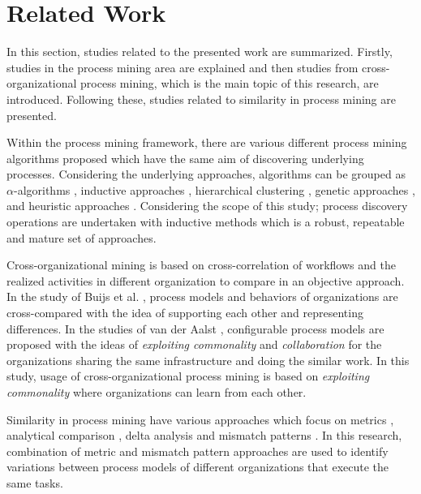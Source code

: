 \section{Related Work}
\label{sec:relatedwork}

In this section, studies related to the presented work are summarized. Firstly, studies in the process mining area are explained and then studies from cross-organizational process mining, which is the main topic of this research, are introduced. Following these, studies related to similarity in process mining are presented.

Within the process mining framework, there are various different process mining algorithms proposed which have the same aim of discovering underlying processes. Considering the underlying approaches, algorithms can be grouped as $\alpha$-algorithms \cite{van2004workflow,de2004process}, inductive approaches \cite{herbst1998integrating,herbst2000dealing}, hierarchical clustering \cite{greco2005mining}, genetic approaches \cite{van2005genetic,esgin2010hybrid}, and heuristic approaches \cite{esgin2009hybrid}. Considering the scope of this study; process discovery operations are undertaken with inductive methods which is a robust, repeatable and mature set of approaches.

Cross-organizational mining is based on cross-correlation of workflows and the realized activities in different organization to compare in an objective approach. In the study of Buijs et al. \cite{buijs2012towards}, process models and behaviors of organizations are cross-compared with the idea of supporting each other and representing differences. In the studies of van der Aalst \cite{van2011business,van2011intra}, configurable process models are proposed with the ideas of \textit{exploiting commonality} and \textit{collaboration} for the organizations sharing the same infrastructure and doing the similar work. In this study, usage of cross-organizational process mining is based on \textit{exploiting commonality} where organizations can learn from each other.

Similarity in process mining have various approaches which focus on metrics \cite{dijkman2011similarity}, analytical comparison \cite{buijs2014comparing}, delta analysis \cite{esgin2011delta,esgin2013sequence} and mismatch patterns \cite{dijkman2007mismatch}. In this research, combination of metric and mismatch pattern approaches are used to identify variations between process models of different organizations that execute the same tasks.